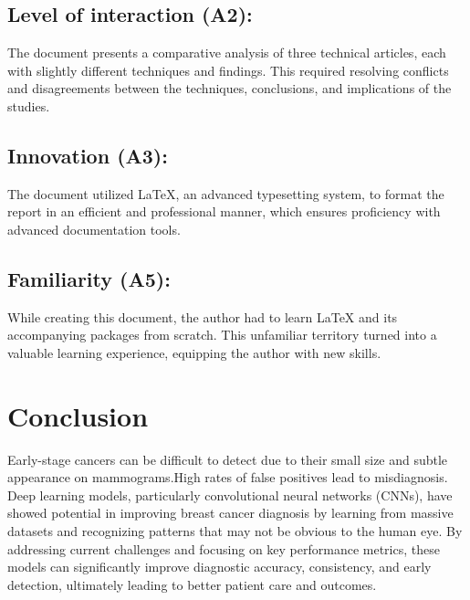 \documentclass[12]{article}
\begin{document}
\subsection{Level of interaction (A2):} 
The document presents a comparative analysis of three technical articles, each with slightly different techniques and findings. This required resolving conflicts and disagreements between the techniques, conclusions, and implications of the studies.

\subsection{Innovation (A3):} 
The document utilized LaTeX, an advanced typesetting system, to format the report in an efficient and professional manner, which ensures proficiency with advanced documentation tools. 

\subsection{Familiarity (A5):} 
While creating this document, the author had to learn LaTeX and its accompanying packages from scratch. This unfamiliar territory turned into a valuable learning experience, equipping the author with new skills.


  
\section{Conclusion}
Early-stage cancers can be difficult to detect due to their small size and subtle appearance on mammograms.High rates of false positives lead to misdiagnosis.
Deep learning models, particularly convolutional neural networks (CNNs), have showed potential in improving breast cancer diagnosis by learning from massive datasets and recognizing patterns that may not be obvious to the human eye.
By addressing current challenges and focusing on key performance metrics, these models can significantly improve diagnostic accuracy, consistency, and early detection, ultimately leading to better patient care and outcomes. 



\end{document}
